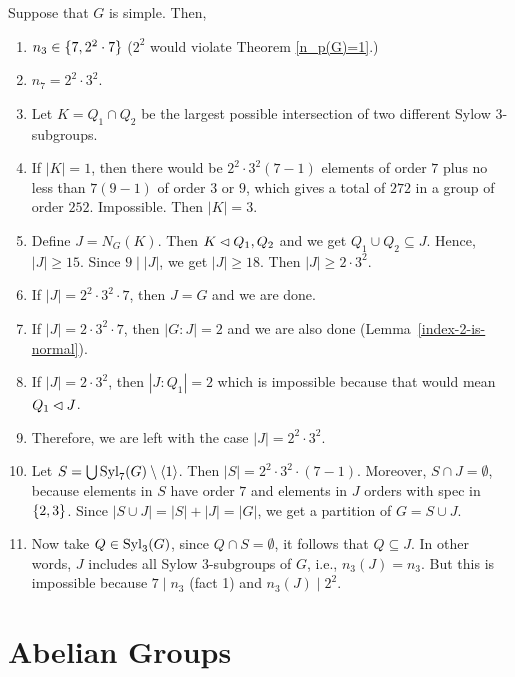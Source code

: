\begin{solution} Suppose that $G$ is simple. Then,

\begin{enumerate}[\rm1.]
    \item $n_3\in\{7,2^2\cdot7\}$ ($2^2$ would violate Theorem \ref{n_p(G)=1}.)
    \item $n_7=2^2\cdot3^2$.
    \item Let $K=Q_1\cap Q_2$ be the largest possible intersection of two different Sylow $3$-subgroups.
    \item If $|K|=1$, then there would be $2^2\cdot3^2(7-1)$ elements of order $7$ plus no less than $7(9-1)$ of order $3$ or $9$, which gives a total of $272$ in a group of order $252$. Impossible. Then $|K|=3$.
    \item Define $J=N_G(K)$. Then $K\lhd Q_1,Q_2$ and we get $Q_1\cup Q_2\subseteq J$. Hence, $|J|\ge 15$. Since $9\mid|J|$, we get $|J|\ge18$. Then $|J|\ge2\cdot3^2$.
    \item If $|J|=2^2\cdot3^2\cdot7$, then $J=G$ and we are done.
    \item If $|J|=2\cdot3^2\cdot7$, then $|G:J|=2$ and we are also done (Lemma~\ref{index-2-is-normal}).
    \item If $|J|=2\cdot3^2$, then $|J:Q_1|=2$ which is impossible because that would mean $Q_1\lhd J$.
    \item Therefore, we are left with the case $|J|=2^2\cdot3^2$.
    \item Let $S=\bigcup{\rm Syl}_7(G)\setminus\langle1\rangle$. Then $|S|=2^2\cdot3^2\cdot(7-1)$. Moreover, $S\cap J=\emptyset$, because elements in $S$ have order $7$ and elements in $J$ orders with spec in $\{2,3\}$. Since $|S\cup J|=|S|+|J|=|G|$, we get a partition of $G=S\cup J$.
    \item Now take $Q\in{\rm Syl}_3(G)$, since $Q\cap S=\emptyset$, it follows that $Q\subseteq J$. In other words, $J$ includes all Sylow $3$-subgroups of $G$, i.e., $n_3(J)=n_3$. But this is impossible because $7\mid n_3$ (fact 1) and $n_3(J)\mid2^2$.
\end{enumerate}
\end{solution}

\section{Abelian Groups}

